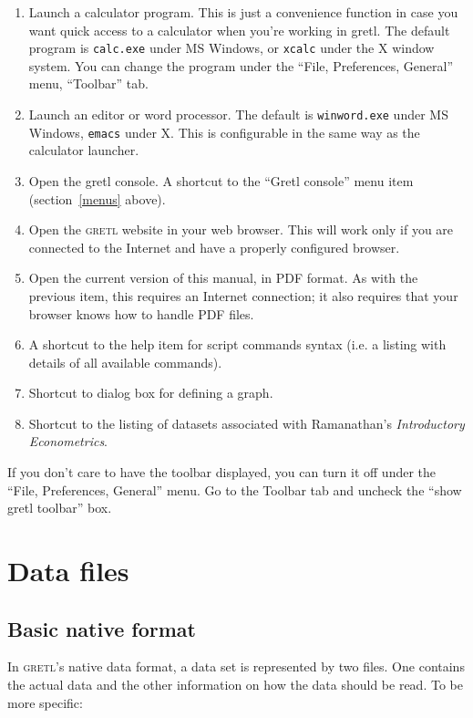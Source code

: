 \documentclass{article}
\begin{document}
\begin{enumerate}
\item Launch a calculator program.  This is just a convenience
  function in case you want quick access to a calculator when you're
  working in \textsf{gretl}.  The default program is \texttt{calc.exe}
  under MS Windows, or \texttt{xcalc} under the X window system.  You
  can change the program under the ``File, Preferences, General''
  menu, ``Toolbar'' tab.
\item Launch an editor or word processor.  The default is
  \texttt{winword.exe} under MS Windows, \texttt{emacs} under X.  This
  is configurable in the same way as the calculator launcher.
\item Open the gretl console.  A shortcut to the ``Gretl console''
  menu item (section~\ref{menus} above).
\item Open the \textsc{gretl} website in your web browser.  This will
  work only if you are connected to the Internet and have a properly
  configured browser.
\item Open the current version of this manual, in PDF format.  As with
  the previous item, this requires an Internet connection; it also
  requires that your browser knows how to handle PDF files.
\item A shortcut to the help item for script commands syntax (i.e. a
  listing with details of all available commands).
\item Shortcut to dialog box for defining a graph.
\item Shortcut to the listing of datasets associated with Ramanathan's
  \textit{Introductory Econometrics}.
\end{enumerate}

If you don't care to have the toolbar displayed, you can turn it off
under the ``File, Preferences, General'' menu.  Go to the Toolbar tab
and uncheck the ``show gretl toolbar'' box.


\section{Data files}
\label{dfiles}

\subsection{Basic native format}

In \textsc{gretl}'s native data format, a data set is represented by
two files.  One contains the actual data and the other information on
how the data should be read.  To be more specific:
\end{document}
